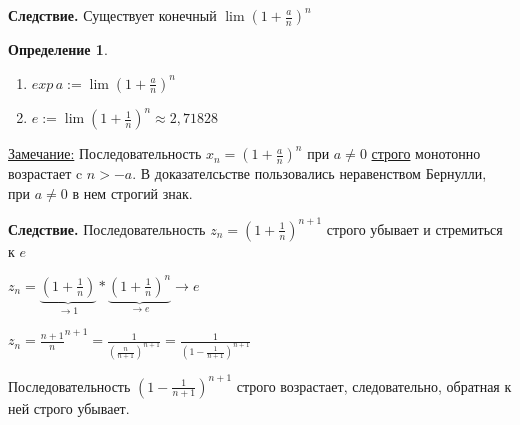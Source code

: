 \documentclass[12pt,letterpaper]{report}
\makeatletter
\theoremstyle{definition}
\newtheorem*{conj}{Определение}
\renewenvironment{proof}[1][\proofname]{%
   \par\pushQED{\qed}\normalfont%
   \topsep6\p@\@plus6\p@\relax
   \trivlist\item[\hskip\labelsep\bfseries#1\@addpunct{.}]%
   \ignorespaces
}{%
   \popQED\endtrivlist\@endpefalse
}
\makeatother
\begin{document}
    \textbf{Следствие.} Существует конечный $\lim (1 + \frac{a}{n})^n$ 
    \begin{conj} \quad \\
        \begin{enumerate}
            \item $exp\,a := \lim (1 + \frac{a}{n})^n$
            \item $e := \lim (1 + \frac{1}{n})^n \approx 2,71828$
        \end{enumerate}
    \end{conj}
    \underline{Замечание:} Последовательность $x_n = (1 + \frac{a}{n})^n$ при $a \neq 0$ \underline{строго} монотонно возрастает c $n > -a$. В доказателсьстве пользовались неравенством Бернулли, при $a \neq 0$ в нем строгий знак.
    \vspace{0.5cm}
    
    \textbf{Следствие.} Последовательность $z_n = (1 + \frac{1}{n})^{n+1}$ строго убывает и стремиться к $e$
    \begin{proof}
        $z_n = \underbrace{(1 + \frac{1}{n})}_{\to 1} * \underbrace{(1 + \frac{1}{n})^n}_{\to e} \to e$
        
        $z_n = \frac{n + 1}{n}^{n+1} = \frac{1}{(\frac{n}{n+1})^{n+1}} = \frac{1}{(1 - \frac{1}{n+1})^{n+1}}$
        
        Последовательность $(1 - \frac{1}{n+1})^{n+1}$ строго возрастает, следовательно, обратная к ней строго убывает. 
    \end{proof}
    
\end{document}
